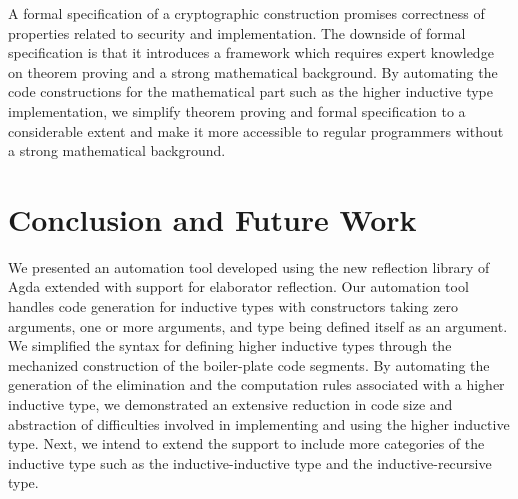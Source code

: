 \documentclass[sigplan,10pt]{acmart}
\begin{document}
A formal specification of a cryptographic construction promises correctness of properties related to security and implementation. The downside of formal specification is that it introduces a framework which requires expert knowledge on theorem proving and a strong mathematical background. By automating the code constructions for the mathematical part such as the higher inductive type implementation, we simplify theorem proving and formal specification to a considerable extent and make it more accessible to regular programmers without a strong mathematical background.

\section{Conclusion and Future Work}
We presented an automation tool developed using the new reflection library of Agda extended with support for elaborator reflection. Our automation tool handles code generation for inductive types with constructors taking zero arguments, one or more arguments, and type being defined itself as an argument. We simplified the syntax for defining higher inductive types through the mechanized construction of the boiler-plate code segments. By automating the generation of the elimination and the computation rules associated with a higher inductive type, we demonstrated an extensive reduction in code size and abstraction of difficulties involved in implementing and using the higher inductive type. Next, we intend to extend the support to include more categories of the inductive type such as the inductive-inductive type and the inductive-recursive type.




\end{document}
